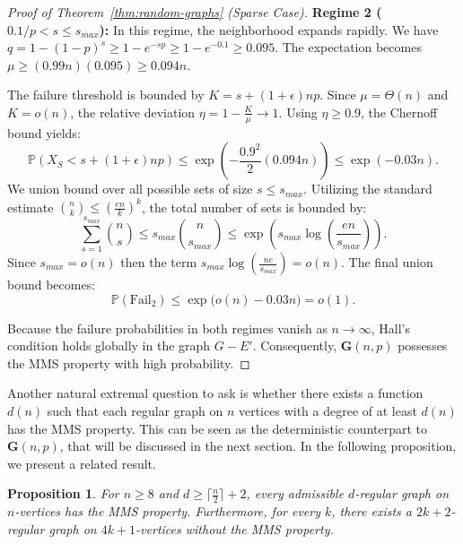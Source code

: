 \documentclass[12pt,UKenglish]{amsart}
\theoremstyle{plain}
\newtheorem{prop}[thm]{Proposition}
\theoremstyle{definition}
\theoremstyle{remark}
\begin{document}
\begin{proof}[Proof of Theorem~\ref{thm:random-graphs} (Sparse Case)]
\textbf{Regime 2 ($0.1/p < s \le s_{max}$):} In this regime, the neighborhood expands rapidly. We have $q = 1 - (1-p)^s \ge 1 - e^{-sp} \ge 1 - e^{-0.1} \ge 0.095$. The expectation becomes $\mu \ge (0.99n)(0.095) \ge 0.094n$.

The failure threshold is bounded by $K = s + (1+\epsilon)np$. Since $\mu = \Theta(n)$ and $K = o(n)$, the relative deviation $\eta = 1 - \frac{K}{\mu} \to 1$. Using $\eta \ge 0.9$, the Chernoff bound yields:
\begin{equation*}
  \mathbb{P}(X_S < s + (1+\epsilon)np) \le \exp\left(-\frac{0.9^2}{2} (0.094n)\right) \le \exp(-0.03n).
\end{equation*}
We union bound over all possible sets of size $s \le s_{max}$. Utilizing the standard estimate $\binom{n}{k} \le \left(\frac{en}{k}\right)^k$, the total number of sets is bounded by:
\begin{equation*}
  \sum_{s=1}^{s_{max}} \binom{n}{s} \le s_{max} \binom{n}{s_{max}} \le \exp\left(s_{max} \log \left(\frac{en}{s_{max}}\right)\right).
\end{equation*}
Since $s_{max}=o(n)$ then the term $s_{max}\log(\frac{ne}{s_{max}})=o(n)$. The final union bound becomes:
\begin{equation*}
  \mathbb{P}(\text{Fail}_2) \le \exp\Big(o(n) - 0.03n \Big)=o(1).
\end{equation*}

Because the failure probabilities in both regimes vanish as $n \to \infty$, Hall's condition holds globally in the graph $G-E'$. Consequently, $\mathbf{G}(n,p)$ possesses the MMS property with high probability.
\end{proof}
Another natural extremal question to ask is whether there exists a function $d(n)$ such that each regular graph on $n$ vertices  with a degree of at least $d(n)$ has the MMS property.
 This can be seen as the deterministic counterpart to $\mathbf{G}(n,p)$, that will be discussed in the next section. In the following proposition, we present a related result.
 \begin{prop}\label{prop:extremal-degree}
  For $n\ge8$ and $d\ge \lceil\frac{n}{2}\rceil+2$, every admissible $d$-regular graph on $n$-vertices has the MMS property.
 Furthermore, for every $k$, there exists a $2k+2$-regular graph on $4k+1$-vertices without the MMS property.
 \end{prop}
\end{document}
